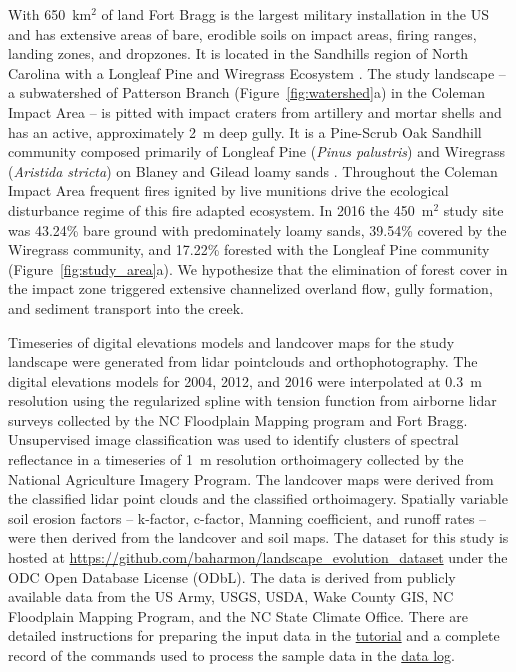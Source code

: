 \documentclass[gmd, manuscript]{copernicus}
\begin{document}
With 650~\unit{km}$^{2}$ of land
Fort Bragg is the largest military installation in the US
and has extensive areas of bare, erodible soils
on impact areas, firing ranges, landing zones, and dropzones. 
It is located in the Sandhills region of North Carolina 
with a Longleaf Pine and Wiregrass Ecosystem \citep{Sorrie2006}.
%
The study landscape 
-- a subwatershed of Patterson Branch (Figure~\ref{fig:watershed}a) 
in the Coleman Impact Area --
is pitted with impact craters from artillery and mortar shells
and has an active, approximately 2~\unit{m} deep gully. 
%
It is a Pine-Scrub Oak Sandhill community
composed primarily of Longleaf Pine (\emph{Pinus palustris})
and Wiregrass (\emph{Aristida stricta})
on Blaney and Gilead loamy sands 
\citep{Sorrie2004}. 
%
Throughout the Coleman Impact Area
frequent fires ignited by live munitions
drive the ecological disturbance regime
of this fire adapted ecosystem.
%
In 2016 the  450~\unit{m}$^{2}$ study site was
43.24\% bare ground with predominately loamy sands,
39.54\% covered by the Wiregrass community, and
17.22\% forested with the Longleaf Pine community 
(Figure~\ref{fig:study_area}a). 
%
We hypothesize that the elimination of forest cover
in the impact zone
triggered extensive channelized overland flow,
gully formation, and sediment transport into the creek. 

Timeseries of digital elevations models 
and landcover maps for the study landscape
were generated from lidar pointclouds and orthophotography.
The digital elevations models for 2004, 2012, and 2016
were interpolated at 0.3~\unit{m} resolution
using the regularized spline with tension function \citep{Mitasova1993,Mitasova2005}
from airborne lidar surveys 
collected by the NC Floodplain Mapping program and Fort Bragg. 
%
Unsupervised image classification 
was used to identify clusters of spectral reflectance
in a timeseries of 1~\unit{m} resolution orthoimagery 
collected by the National Agriculture Imagery Program.
The landcover maps were derived from the
classified lidar point clouds and the classified orthoimagery.
Spatially variable soil erosion factors 
-- k-factor, c-factor, Manning coefficient, and runoff rates --
were then derived from the landcover and soil maps.
The dataset for this study is hosted at 
\url{https://github.com/baharmon/landscape\_evolution_dataset}
under the ODC Open Database License (ODbL).
The data is derived from publicly available data from
the US Army, USGS, USDA, Wake County GIS, NC Floodplain
Mapping Program, and the NC State Climate Office.
There are detailed instructions for preparing the input data in the 
\href{https://github.com/baharmon/landscape_evolution/blob/master/tutorial.md}{tutorial}
and a complete record of the commands used to process the sample data in the
\href{https://github.com/baharmon/landscape_evolution_dataset/blob/master/nc_spm_evolution/DATA.md}{data log}.
\end{document}
